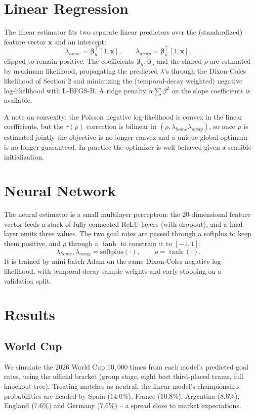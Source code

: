 \documentclass{article}
\begin{document}
\section{Linear Regression}

The linear estimator fits two separate linear predictors over the (standardized) feature vector $\mathbf{x}$ and an intercept:
\[
\lambda_{home} = \boldsymbol\beta_h^\top [1,\mathbf{x}], \qquad
\lambda_{away} = \boldsymbol\beta_a^\top [1,\mathbf{x}],
\]
clipped to remain positive. The coefficients $\boldsymbol\beta_h,\boldsymbol\beta_a$ and the shared $\rho$ are estimated by maximum likelihood, propagating the predicted $\lambda$'s through the Dixon-Coles likelihood of Section 2 and minimizing the (temporal-decay weighted) negative log-likelihood with L-BFGS-B. A ridge penalty $\alpha\sum\beta^2$ on the slope coefficients is available.

A note on convexity: the Poisson negative log-likelihood is convex in the linear coefficients, but the $\tau(\rho)$ correction is bilinear in $(\rho, \lambda_{home}\lambda_{away})$, so once $\rho$ is estimated jointly the objective is no longer convex and a unique global optimum is no longer guaranteed. In practice the optimizer is well-behaved given a sensible initialization.

\section{Neural Network}

The neural estimator is a small multilayer perceptron: the 20-dimensional feature vector feeds a stack of fully connected ReLU layers (with dropout), and a final layer emits three values. The two goal rates are passed through a softplus to keep them positive, and $\rho$ through a $\tanh$ to constrain it to $[-1,1]$:
\[
\lambda_{home}, \lambda_{away} = \text{softplus}(\cdot), \qquad \rho = \tanh(\cdot).
\]
It is trained by mini-batch Adam on the same Dixon-Coles negative log-likelihood, with temporal-decay sample weights and early stopping on a validation split.

\section{Results}
\subsection{World Cup}

We simulate the 2026 World Cup $10{,}000$ times from each model's predicted goal rates, using the official bracket (group stage, eight best third-placed teams, full knockout tree). Treating matches as neutral, the linear model's championship probabilities are headed by Spain ($14.0\%$), France ($10.8\%$), Argentina ($8.6\%$), England ($7.6\%$) and Germany ($7.6\%$) -- a spread close to market expectations.
\end{document}
